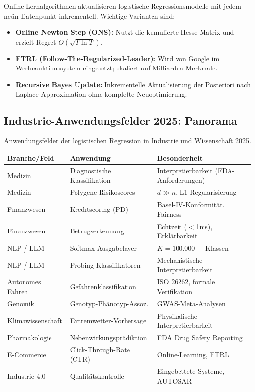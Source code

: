 ﻿\documentclass[12pt, a4paper]{article}
\theoremstyle{definition}
\theoremstyle{remark}
\begin{document}
Online-Lernalgorithmen aktualisieren logistische Regressionsmodelle mit jedem neün
Datenpunkt inkrementell. Wichtige Varianten sind:

\begin{itemize}
  \item \textbf{Online Newton Step (ONS):} Nutzt die kumulierte Hesse-Matrix und erzielt
    Regret $O(\sqrt{T\ln T})$.
  \item \textbf{FTRL (Follow-The-Regularized-Leader):} Wird von Google im Werbeauktionssystem
    eingesetzt; skaliert auf Milliarden Merkmale.
  \item \textbf{Recursive Bayes Update:} Inkrementelle Aktualisierung der Posteriori nach
    Laplace-Approximation ohne komplette Neuoptimierung.
\end{itemize}

\subsection{Industrie-Anwendungsfelder 2025: Panorama}

\begin{table}[H]
  \centering
  \caption{Anwendungsfelder der logistischen Regression in Industrie und Wissenschaft 2025.}
  \small
  \begin{tabular}{lll}
    \toprule
    Branche/Feld & Anwendung & Besonderheit \\
    \midrule
    Medizin & Diagnostische Klassifikation & Interpretierbarkeit (FDA-Anforderungen) \\
    Medizin & Polygene Risikoscores & $d \gg n$, L1-Regularisierung \\
    Finanzwesen & Kreditscoring (PD) & Basel-IV-Konformität, Fairness \\
    Finanzwesen & Betrugserkennung & Echtzeit ($<$1ms), Erklärbarkeit \\
    NLP / LLM & Softmax-Ausgabelayer & $K = 100.000+$ Klassen \\
    NLP / LLM & Probing-Klassifikatoren & Mechanistische Interpretierbarkeit \\
    Autonomes Fahren & Gefahrenklassifikation & ISO 26262, formale Verifikation \\
    Genomik & Genotyp-Phänotyp-Assoz. & GWAS-Meta-Analysen \\
    Klimawissenschaft & Extremwetter-Vorhersage & Physikalische Interpretierbarkeit \\
    Pharmakologie & Nebenwirkungsprädiktion & FDA Drug Safety Reporting \\
    E-Commerce & Click-Through-Rate (CTR) & Online-Learning, FTRL \\
    Industrie 4.0 & Qualitätskontrolle & Eingebettete Systeme, AUTOSAR \\
    \bottomrule
  \end{tabular}
  \label{tab:applications}
\end{table}
\end{document}
